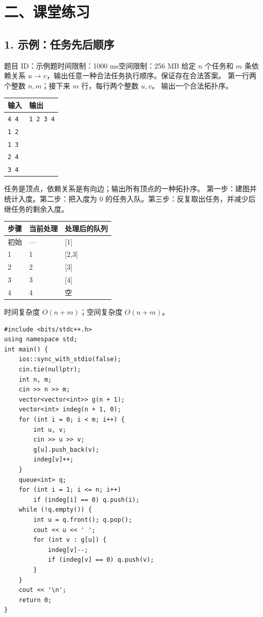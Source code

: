 \documentclass[UTF8,10.9pt]{ctexart}
\begin{document}
\section{二、课堂练习}
\subsection{1. 示例：任务先后顺序}
\noindent 题目 ID：示例题\qquad 时间限制：1000 ms\qquad 空间限制：256 MB
给定 $n$ 个任务和 $m$ 条依赖关系 $u\to v$，输出任意一种合法任务执行顺序。保证存在合法答案。
第一行两个整数 $n,m$；接下来 $m$ 行，每行两个整数 $u,v$。
输出一个合法拓扑序。
\begin{center}\begin{tabularx}{.9\linewidth}{XX}\toprule 输入 & 输出\\\midrule
\texttt{4 4} & \texttt{1 2 3 4}\\
\texttt{1 2} & \\
\texttt{1 3} & \\
\texttt{2 4} & \\
\texttt{3 4} & \\\bottomrule\end{tabularx}\end{center}
任务是顶点，依赖关系是有向边；输出所有顶点的一种拓扑序。
第一步：建图并统计入度。第二步：把入度为 0 的任务入队。第三步：反复取出任务，并减少后继任务的剩余入度。
\begin{center}\begin{tabularx}{.95\linewidth}{lXX}\toprule 步骤 & 当前处理 & 处理后的队列\\\midrule
初始 & — & [1]\\
1 & 1 & [2,3]\\
2 & 2 & [3]\\
3 & 3 & [4]\\
4 & 4 & 空\\\bottomrule\end{tabularx}\end{center}
时间复杂度 $O(n+m)$；空间复杂度 $O(n+m)$。
\begin{lstlisting}
#include <bits/stdc++.h>
using namespace std;
int main() {
    ios::sync_with_stdio(false);
    cin.tie(nullptr);
    int n, m;
    cin >> n >> m;
    vector<vector<int>> g(n + 1);
    vector<int> indeg(n + 1, 0);
    for (int i = 0; i < m; i++) {
        int u, v;
        cin >> u >> v;
        g[u].push_back(v);
        indeg[v]++;
    }
    queue<int> q;
    for (int i = 1; i <= n; i++)
        if (indeg[i] == 0) q.push(i);
    while (!q.empty()) {
        int u = q.front(); q.pop();
        cout << u << ' ';
        for (int v : g[u]) {
            indeg[v]--;
            if (indeg[v] == 0) q.push(v);
        }
    }
    cout << '\n';
    return 0;
}
\end{lstlisting}
\end{document}
